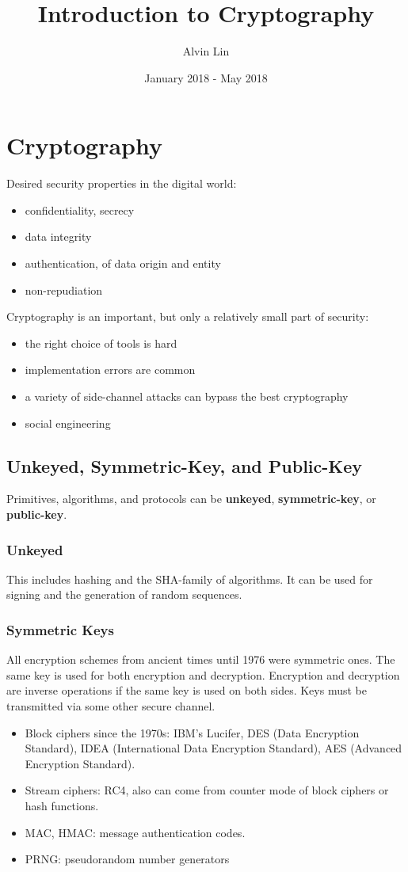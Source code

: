 \documentclass{math}
\title{Introduction to Cryptography}
\author{Alvin Lin}
\date{January 2018 - May 2018}
\begin{document}
\maketitle

\section*{Cryptography}
Desired security properties in the digital world:
\begin{itemize}
  \item confidentiality, secrecy
  \item data integrity
  \item authentication, of data origin and entity
  \item non-repudiation
\end{itemize}
Cryptography is an important, but only a relatively small part of security:
\begin{itemize}
  \item the right choice of tools is hard
  \item implementation errors are common
  \item a variety of side-channel attacks can bypass the best cryptography
  \item social engineering
\end{itemize}

\subsection*{Unkeyed, Symmetric-Key, and Public-Key}
Primitives, algorithms, and protocols can be \textbf{unkeyed},
\textbf{symmetric-key}, or \textbf{public-key}.

\subsubsection*{Unkeyed}
This includes hashing and the SHA-family of algorithms. It can be used for
signing and the generation of random sequences.

\subsubsection*{Symmetric Keys}
All encryption schemes from ancient times until 1976 were symmetric ones. The
same key is used for both encryption and decryption. Encryption and decryption
are inverse operations if the same key is used on both sides. Keys must be
transmitted via some other secure channel.
\begin{itemize}
  \item Block ciphers since the 1970s: IBM's Lucifer, DES (Data Encryption
  Standard), IDEA (International Data Encryption Standard), AES (Advanced
  Encryption Standard).
  \item Stream ciphers: RC4, also can come from counter mode of block ciphers
  or hash functions.
  \item MAC, HMAC: message authentication codes.
  \item PRNG: pseudorandom number generators
\end{itemize}
\end{document}
